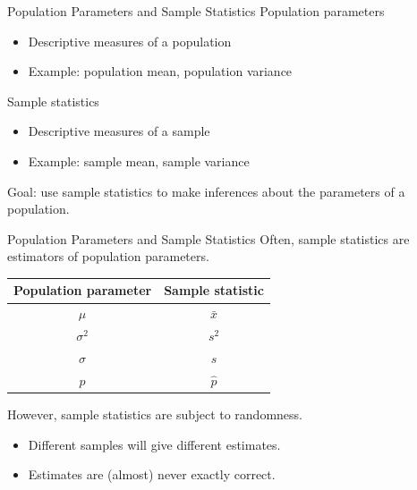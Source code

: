 \documentclass{beamer}
\let\thefootnote\relax\footnotetext{\tiny{*  Office Hours: Wed \& Fri 10:00 - 11:30 AM, KMC 8-174}}
\begin{document}
\begin{frame}{Population Parameters and Sample Statistics}
Population parameters
\begin{itemize}
\item Descriptive measures of a \alert{population}
\item Example: population mean, population variance
\end{itemize}

Sample statistics
\begin{itemize}
\item Descriptive measures of a \alert{sample}
\item Example: sample mean, sample variance
\end{itemize}

Goal: use sample statistics to make inferences about the parameters of a population.
\end{frame}

\begin{frame}{Population Parameters and Sample Statistics}
Often, sample statistics are estimators of population parameters.
\begin{table}\begin{center}
\begin{tabular}{ |c|c|}
\hline
Population parameter  & Sample statistic \\\hline
$\mu$ & $\bar x$ \\ \hline
$\sigma^2$ & $s^2$\\ \hline
$\sigma$ &  $s$ \\ \hline
$p$ & $\hat p$ \\ \hline
\end{tabular}
\end{center}\end{table}

However, sample statistics are subject to randomness.
\begin{itemize}
\item Different samples will give different estimates.
\item Estimates are (almost) never exactly correct.
\end{itemize}
\let\thefootnote\relax{}

\end{frame}
\end{document}
